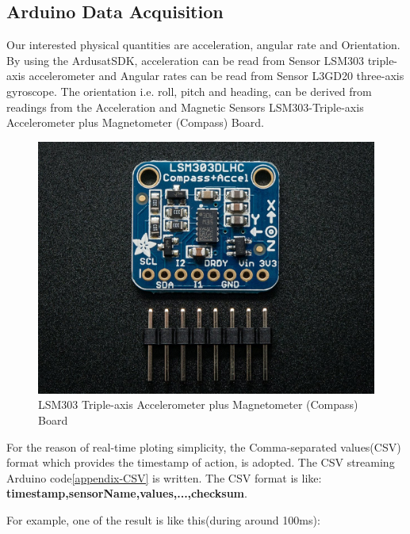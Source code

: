 \subsection{Arduino Data Acquisition}
Our interested physical quantities are acceleration, angular rate and Orientation. By using the ArdusatSDK\cite{https://github.com/ArduSat/ArdusatSDK}, acceleration can be read from Sensor LSM303 triple-axis accelerometer and Angular rates can be read from Sensor L3GD20 three-axis gyroscope. The orientation i.e. roll, pitch and heading, can be derived from readings from the Acceleration and Magnetic Sensors LSM303-Triple-axis Accelerometer plus Magnetometer (Compass) Board.

\begin{figure}[!b]
\centering
\includegraphics{fig/DOE/LSM}
\caption{LSM303 Triple-axis Accelerometer plus Magnetometer (Compass) Board}
\end{figure}

For the reason of real-time ploting simplicity, the Comma-separated values(CSV) format which provides the timestamp of action, is adopted. The CSV streaming Arduino code\ref{appendix-CSV} is written. The CSV format is like: \textbf{timestamp,sensorName,values,...,checksum}.

For example, one of the result is like this(during around 100ms):

